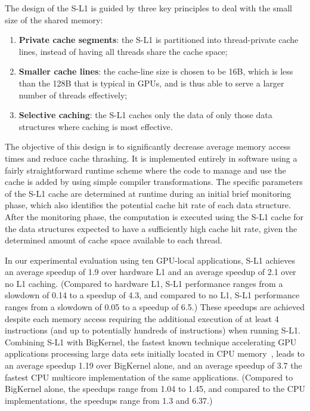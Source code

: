 The design of the S-L1 is guided by three key principles to deal with the small size of
the shared memory:
\begin{enumerate}
\item {\bf Private cache segments}: the S-L1 is partitioned into thread-private cache lines,
instead of having all threads share the cache space; 
\item {\bf Smaller cache lines}: the cache-line size is chosen to be 16B, which is less than the 128B that is typical in GPUs, and is thus able to serve a larger number of threads effectively;
\item {\bf Selective caching}: the S-L1 caches only the data of only those data structures where caching is most effective.
\end{enumerate}
The objective of this design is to significantly decrease average memory access times and reduce 
cache thrashing. 
It is implemented entirely in software using a fairly straightforward runtime scheme where the code
to manage and use the cache is added by using simple compiler transformations.
The specific parameters of the S-L1 cache are determined at runtime during an initial brief
monitoring phase, which also identifies the potential cache hit rate of each data structure.
After the monitoring phase, the computation is executed using the S-L1 cache for the data structures expected to have a sufficiently
high cache hit rate, given the determined amount of cache space available to each thread.


In our experimental evaluation using ten GPU-local applications, S-L1 achieves an average speedup of 1.9 over hardware L1 and an average speedup of 2.1
over no L1 caching. (Compared to hardware L1, S-L1 performance ranges from a slowdown of 0.14 to a speedup of 4.3, and compared to no L1, S-L1
performance ranges from a slowdown of 0.05 to a speedup of 6.5.) These speedups are achieved despite each memory access requiring the additional
execution of at least 4 instructions (and up to potentially hundreds of instructions) when running S-L1. 
Combining S-L1 with BigKernel, the fastest known technique accelerating GPU applications processing
large data sets initially located in CPU memory~\cite{mokhtari2014bigkernel}, leads to an average speedup 1.19 over BigKernel alone,
and an average speedup of 3.7 the fastest CPU multicore implementation
of the same applications. (Compared to BigKernel alone, the speedups range from 1.04 to 1.45, and compared to the CPU implementations, the speedups range from
1.3 and 6.37.)

